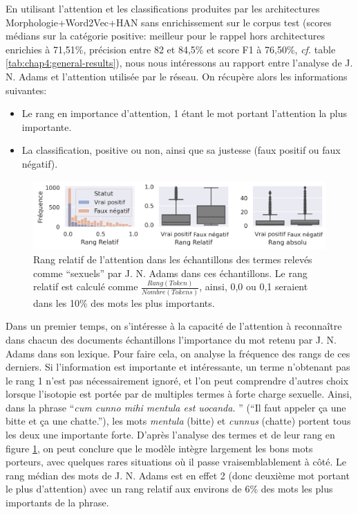 En utilisant l'attention et les classifications produites par les architectures Morphologie+Word2Vec+HAN sans enrichissement sur le corpus test (scores médians sur la catégorie positive: meilleur pour le rappel hors architectures enrichies à 71,51\%, précision entre 82 et 84,5\% et score F1 à 76,50\%, \textit{cf.} table \ref{tab:chap4:general-results}), nous nous intéressons au rapport entre l'analyse de J. N. Adams et l'attention utilisée par le réseau. On récupère alors les informations suivantes:
\begin{itemize}
    \item Le rang en importance d'attention, 1 étant le mot portant l'attention la plus importante.
    \item La classification, positive ou non, ainsi que sa justesse (faux positif ou faux négatif).
\end{itemize}

\begin{figure}
    \centering
    \includegraphics[width=\linewidth]{figures/chap4/ranksStatus.png}
    \caption{Rang relatif de l'attention dans les échantillons des termes relevés comme ``sexuels'' par J. N. Adams dans ces échantillons. Le rang relatif est calculé comme $\frac{Rang(Token)}{Nombre(Tokens)}$, ainsi, 0,0 ou 0,1 seraient dans les 10\% des mots les plus importants.}
    \label{fig:chap4:ranks-attention}
\end{figure}

Dans un premier temps, on s'intéresse à la capacité de l'attention à reconnaître dans chacun des documents échantillons l'importance du mot retenu par J. N. Adams dans son lexique. Pour faire cela, on analyse la fréquence des rangs de ces derniers. Si l'information est importante et intéressante, un terme n'obtenant pas le rang 1 n'est pas nécessairement ignoré, et l'on peut comprendre d'autres choix lorsque l'isotopie est portée par de multiples termes à forte charge sexuelle. Ainsi, dans la phrase ``\textit{cum cunno mihi mentula est uocanda. }'' (``Il faut appeler ça une bitte et ça une chatte.''), les mots \textit{mentula} (bitte) et \textit{cunnus} (chatte) portent tous les deux une importante forte. D'après l'analyse des termes et de leur rang en figure \ref{fig:chap4:ranks-attention}, on peut conclure que le modèle intègre largement les bons mots porteurs, avec quelques rares situations où il passe vraisemblablement à côté. Le rang médian des mots de J. N. Adams est en effet 2 (donc deuxième mot portant le plus d'attention) avec un rang relatif aux environs de 6\% des mots les plus importants de la phrase.

